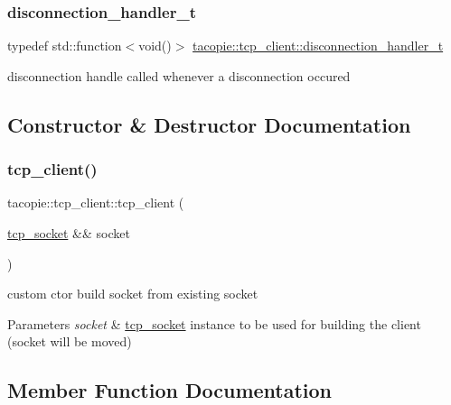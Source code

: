 \subsubsection{\texorpdfstring{disconnection\+\_\+handler\+\_\+t}{disconnection\_handler\_t}}
{\footnotesize\ttfamily typedef std\+::function$<$void()$>$ \hyperlink{classtacopie_1_1tcp__client_aca5df52e5ee6fa673cf212532ada1453}{tacopie\+::tcp\+\_\+client\+::disconnection\+\_\+handler\+\_\+t}}

disconnection handle called whenever a disconnection occured 

\subsection{Constructor \& Destructor Documentation}
\mbox{\label{classtacopie_1_1tcp__client_a773fbcbb5b79324c8d065e363de73282}} 
\subsubsection{\texorpdfstring{tcp\+\_\+client()}{tcp\_client()}}
{\footnotesize\ttfamily tacopie\+::tcp\+\_\+client\+::tcp\+\_\+client (\begin{DoxyParamCaption}\item[{\hyperlink{classtacopie_1_1tcp__socket}{tcp\+\_\+socket} \&\&}]{socket }\end{DoxyParamCaption})\hspace{0.3cm}{\ttfamily [explicit]}}

custom ctor build socket from existing socket


\begin{DoxyParams}{Parameters}
{\em socket} & \hyperlink{classtacopie_1_1tcp__socket}{tcp\+\_\+socket} instance to be used for building the client (socket will be moved) \\
\hline
\end{DoxyParams}


\subsection{Member Function Documentation}
\mbox{\label{classtacopie_1_1tcp__client_a120e3ec2902acc902f7a0b27074bda6b}} 
